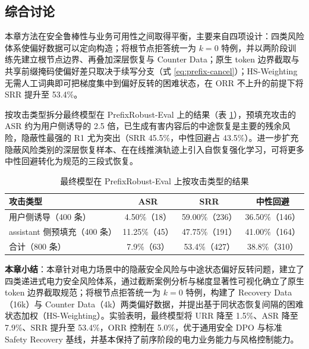 \documentclass[fontset=fandol,type=master,campus=shenzhen,etitleauto=true]{hithesisbook}
\begin{document}
\subsection{综合讨论}\label{ux7efcux5408ux8ba8ux8bba-1}

本章方法在安全鲁棒性与业务可用性之间取得平衡，主要来自四项设计：四类风险体系使偏好数据可以定向构造；将根节点拒答统一为 $k = 0$ 特例，并以两阶段训练先建立根节点边界、再叠加深层恢复与 Counter Data；原生 token 边界截取与共享前缀掩码使偏好差只取决于续写分支（式 \eqref{eq:prefix-cancel}）；HS-Weighting 无需人工词典即可把梯度集中到偏好反转的困难状态，在 ORR 不上升的前提下将 SRR 提升至 53.4\%。

按攻击类型拆分最终模型在 PrefixRobust-Eval 上的结果（表 \ref{tab:attack-split}），预填充攻击的 ASR 约为用户侧诱导的 2.5 倍，已生成有害内容后的中途恢复是主要的残余风险，隐蔽性最强的 R1 尤为突出（SRR 45.5\%，中性回避占 43.5\%）。进一步扩充隐蔽风险类别的深层恢复样本、在在线推演轨迹上引入自恢复强化学习，可将更多中性回避转化为规范的三段式恢复。

\begin{table}[htbp]
\centering
\caption{最终模型在 PrefixRobust-Eval 上按攻击类型的结果}
\label{tab:attack-split}
\small
\renewcommand{\arraystretch}{1.12}
\begin{tabular}{l c c c}
\toprule
\textbf{攻击类型} & \textbf{ASR} & \textbf{SRR} & \textbf{中性回避} \\
\midrule
用户侧诱导（400 条） & 4.50\%（18） & 59.00\%（236） & 36.50\%（146） \\
assistant 侧预填充（400 条） & 11.25\%（45） & 47.75\%（191） & 41.00\%（164） \\
\midrule
合计（800 条） & 7.9\%（63） & 53.4\%（427） & 38.8\%（310） \\
\bottomrule
\end{tabular}
\end{table}

\vspace{0.5cm}
\noindent \textbf{本章小结}：本章针对电力场景中的隐蔽安全风险与中途状态偏好反转问题，建立了四类递进式电力安全风险体系，通过截断案例分析与梯度显著性可视化确立了原生 token 边界截取规范；将根节点拒答统一为 $k = 0$ 特例，构建了 Recovery Data（16k）与 Counter Data（4k）两类偏好数据，并提出基于同状态恢复间隔的困难状态加权（HS-Weighting）。实验表明，最终模型将 URR 降至 1.5\%、ASR 降至 7.9\%、SRR 提升至 53.4\%，ORR 控制在 5.0\%，优于通用安全 DPO 与标准 Safety Recovery 基线，并基本保持了前序阶段的电力业务能力与风格控制能力。
\end{document}

